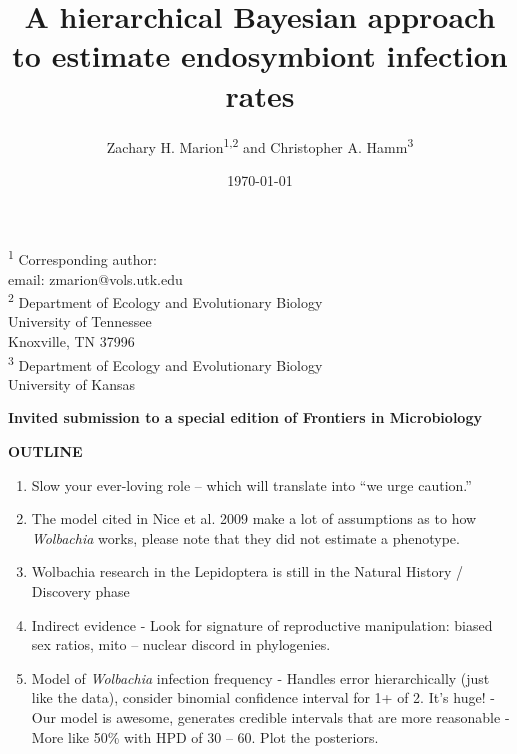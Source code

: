 \documentclass[12pt]{article}
\begin{document}
\raggedright
\setlength{\parindent}{0.3in}

\begin{titlepage}
\title{A hierarchical Bayesian approach to estimate endosymbiont infection rates}
\author{Zachary H. Marion\textsuperscript{1,2} and Christopher A. Hamm\textsuperscript{3}}
\date{\today}
\maketitle

\textsuperscript{1} Corresponding author:\\
email: zmarion@vols.utk.edu\\

\textsuperscript{2}
Department of Ecology and Evolutionary Biology\\
University of Tennessee\\
Knoxville, TN 37996\\

\textsuperscript{3}
Department of Ecology and Evolutionary Biology\\
University of Kansas\\
\hfill

\textbf{Invited submission to a special edition of Frontiers in Microbiology}
\end{titlepage}
\textbf{OUTLINE}
\begin{enumerate}
\item Slow your ever-loving role – which will translate into “we urge caution.”
\item The model cited in Nice et al. 2009 make a lot of assumptions as to how \textit{Wolbachia} works, please note that they did not estimate a phenotype.
\item Wolbachia research in the Lepidoptera is still in the Natural History / Discovery phase

\item Indirect evidence - Look for signature of reproductive manipulation: biased sex ratios, mito – nuclear discord in phylogenies. 


\item  Model of \textit{Wolbachia} infection frequency - Handles error hierarchically (just like the data), consider binomial confidence interval for 1+ of 2. It’s huge! - Our model is awesome, generates credible intervals that are more reasonable - More like 50\% with HPD of 30 – 60. Plot the posteriors. 
\end{enumerate}
\end{document}
